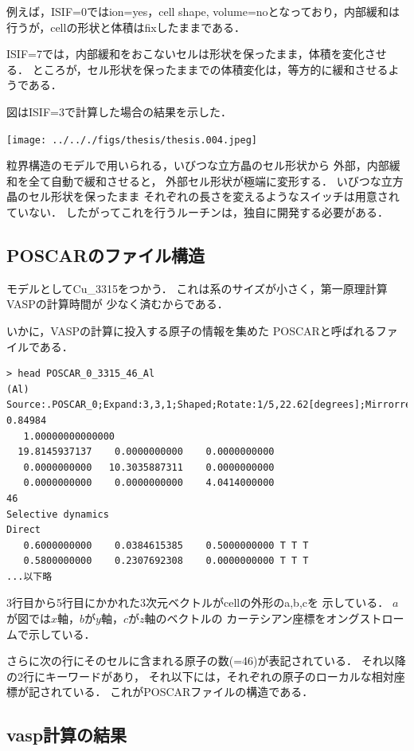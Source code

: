 例えば，ISIF=0ではion=yes，cell shape,
volume=noとなっており，内部緩和は行うが，cellの形状と体積はfixしたままである．

ISIF=7では，内部緩和をおこないセルは形状を保ったまま，体積を変化させる．
ところが，セル形状を保ったままでの体積変化は，等方的に緩和させるようである．

図はISIF=3で計算した場合の結果を示した．
\begin{center}
\texttt{[image: ../.././figs/thesis/thesis.004.jpeg]}
\end{center}


\label{fig:}
粒界構造のモデルで用いられる，いびつな立方晶のセル形状から
外部，内部緩和を全て自動で緩和させると， 外部セル形状が極端に変形する．
いびつな立方晶のセル形状を保ったまま
それぞれの長さを変えるようなスイッチは用意されていない．
したがってこれを行うルーチンは，独自に開発する必要がある．

    \subsection{POSCARのファイル構造}\label{poscarux306eux30d5ux30a1ux30a4ux30ebux69cbux9020}

モデルとしてCu\_3315をつかう．
これは系のサイズが小さく，第一原理計算VASPの計算時間が
少なく済むからである．

いかに，VASPの計算に投入する原子の情報を集めた
POSCARと呼ばれるファイルである．

\begin{verbatim}
> head POSCAR_0_3315_46_Al
(Al) Source:.POSCAR_0;Expand:3,3,1;Shaped;Rotate:1/5,22.62[degrees];Mirrorred;Shaped2;Cut:0.81715-0.84984
   1.00000000000000
  19.8145937137    0.0000000000    0.0000000000
   0.0000000000   10.3035887311    0.0000000000
   0.0000000000    0.0000000000    4.0414000000
46
Selective dynamics
Direct
   0.6000000000    0.0384615385    0.5000000000 T T T
   0.5800000000    0.2307692308    0.0000000000 T T T
...以下略
\end{verbatim}

3行目から5行目にかかれた3次元ベクトルがcellの外形のa,b,cを 示している．
\(a\)が図では\(x\)軸，\(b\)が\(y\)軸，\(c\)が\(z\)軸のベクトルの
カーテシアン座標をオングストロームで示している．

さらに次の行にそのセルに含まれる原子の数(=46)が表記されている．
それ以降の2行にキーワードがあり，
それ以下には，それぞれの原子のローカルな相対座標が記されている．
これがPOSCARファイルの構造である．

    \subsection{vasp計算の結果}\label{vaspux8a08ux7b97ux306eux7d50ux679c}

